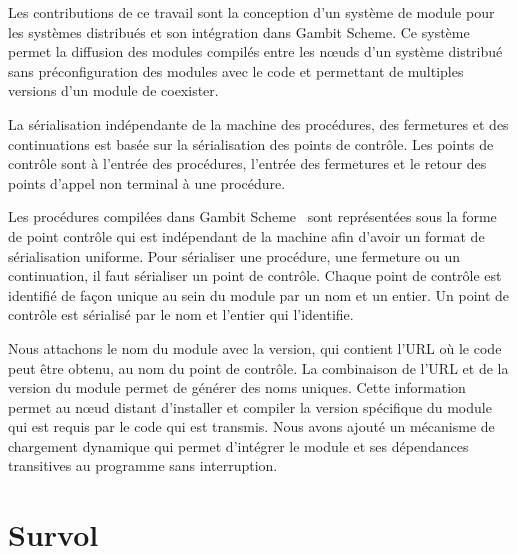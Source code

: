 Les contributions de ce travail sont la conception d'un système de module pour
les systèmes distribués et son intégration dans Gambit Scheme. Ce système
permet la diffusion des modules compilés entre les nœuds d'un système
distribué sans préconfiguration des modules avec le code et permettant
de multiples versions d'un module de coexister.

La sérialisation indépendante de la machine des procédures, des fermetures et
des continuations est basée sur la sérialisation des points de contrôle. Les
points de contrôle sont à l'entrée des procédures, l'entrée des fermetures
et le retour des points d'appel non terminal à une procédure.

Les procédures compilées dans Gambit Scheme~\cite{gambitdoc} sont représentées
sous la forme de point contrôle qui est indépendant de la machine afin d'avoir
un format de sérialisation uniforme. Pour sérialiser une procédure, une
fermeture ou un continuation, il faut sérialiser un point de contrôle. Chaque
point de contrôle est identifié de façon unique au sein du module par un nom et
un entier. Un point de contrôle est sérialisé par le nom et l'entier qui
l'identifie.

Nous attachons le nom du module avec la version, qui contient l'URL où le code
peut être obtenu, au nom du point de contrôle. La combinaison de l'URL et de la
version du module permet de générer des noms uniques. Cette information permet
au nœud distant d'installer et compiler la version spécifique du module qui est
requis par le code qui est transmis.  Nous avons ajouté un mécanisme de
chargement dynamique qui permet d'intégrer le module et ses dépendances
transitives au programme sans interruption.


\section{Survol}

